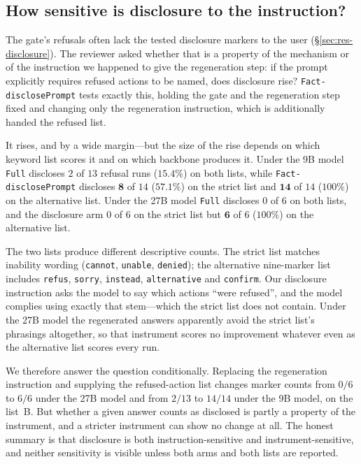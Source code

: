 \documentclass[11pt]{article}
\begin{document}
\subsection{How sensitive is disclosure to the instruction?}
\label{sec:res-disclose-sens}

The gate's refusals often lack the tested disclosure markers to the user
(\S\ref{sec:res-disclosure}). The reviewer asked whether that is a property of the
mechanism or of the instruction we happened to give the regeneration step: if the
prompt explicitly requires refused actions to be named, does disclosure rise?
\texttt{Fact-disclosePrompt} tests exactly this, holding the gate and the
regeneration step fixed and changing only the regeneration instruction, which is
additionally handed the refused list.

It rises, and by a wide margin---but the size of the rise depends on which keyword list
scores it and on which backbone produces it. Under the 9B model \texttt{Full} discloses
$2$ of $13$ refusal runs ($15.4\%$) on both lists, while \texttt{Fact-disclosePrompt}
discloses $\mathbf{8}$ of $14$ ($57.1\%$) on the strict list and $\mathbf{14}$ of $14$
($100\%$) on the alternative list. Under the 27B model \texttt{Full} discloses $0$ of $6$ on
both lists, and the disclosure arm $0$ of $6$ on the strict list but $\mathbf{6}$ of $6$
($100\%$) on the alternative list.

The two lists produce different descriptive counts. The strict list matches inability wording (\texttt{cannot},
\texttt{unable}, \texttt{denied}); the alternative nine-marker list includes \texttt{refus},
\texttt{sorry}, \texttt{instead}, \texttt{alternative} and \texttt{confirm}. Our
disclosure instruction asks the model to say which actions ``were refused'', and the
model complies using exactly that stem---which the strict list does not contain. Under
the 27B model the regenerated answers apparently avoid the strict list's phrasings
altogether, so that instrument scores no improvement whatever even as the alternative list
scores every run.

We therefore answer the question conditionally. Replacing the regeneration instruction and supplying the refused-action list changes marker counts from $0/6$ to $6/6$ under the 27B model and from $2/13$ to $14/14$
under the 9B model, on the list~B. But whether a given answer counts as
disclosed is partly a property of the instrument, and a stricter instrument can show no
change at all. The honest summary is that disclosure is both instruction-sensitive and
instrument-sensitive, and neither sensitivity is visible unless both arms and both lists
are reported.
\end{document}
